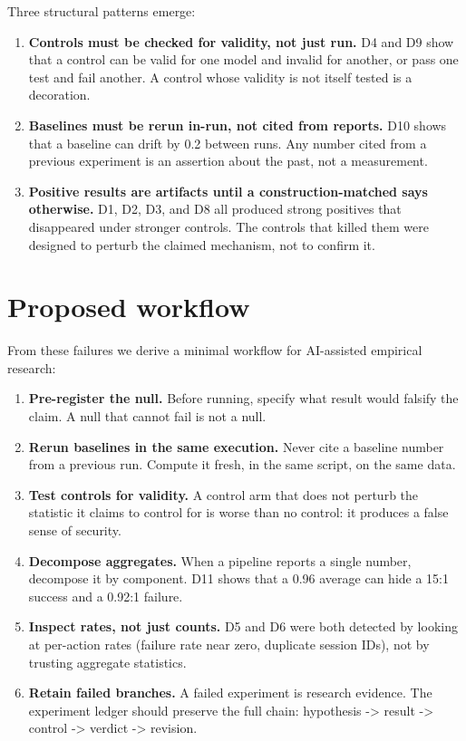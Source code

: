 \documentclass[11pt]{article}
\begin{document}
Three structural patterns emerge:

\begin{enumerate}
\item \textbf{Controls must be checked for validity, not just run.} D4
and D9 show that a control can be valid for one model and invalid for
another, or pass one test and fail another. A control whose validity is
not itself tested is a decoration.

\item \textbf{Baselines must be rerun in-run, not cited from reports.} D10
shows that a baseline can drift by 0.2 between runs. Any number cited
from a previous experiment is an assertion about the past, not a
measurement.

\item \textbf{Positive results are artifacts until a construction-matched
says otherwise.} D1, D2, D3, and D8 all produced strong positives that
disappeared under stronger controls. The controls that killed them were
designed to perturb the claimed mechanism, not to confirm it.
\end{enumerate}

\section{Proposed workflow}

From these failures we derive a minimal workflow for AI-assisted
empirical research:

\begin{enumerate}
\item \textbf{Pre-register the null.} Before running, specify what result
would falsify the claim. A null that cannot fail is not a null.

\item \textbf{Rerun baselines in the same execution.} Never cite a
baseline number from a previous run. Compute it fresh, in the same
script, on the same data.

\item \textbf{Test controls for validity.} A control arm that does not
perturb the statistic it claims to control for is worse than no control:
it produces a false sense of security.

\item \textbf{Decompose aggregates.} When a pipeline reports a single
number, decompose it by component. D11 shows that a 0.96 average can hide
a 15:1 success and a 0.92:1 failure.

\item \textbf{Inspect rates, not just counts.} D5 and D6 were both
detected by looking at per-action rates (failure rate near zero,
duplicate session IDs), not by trusting aggregate statistics.

\item \textbf{Retain failed branches.} A failed experiment is research
evidence. The experiment ledger should preserve the full chain:
hypothesis -> result -> control -> verdict -> revision.
\end{enumerate}
\end{document}
